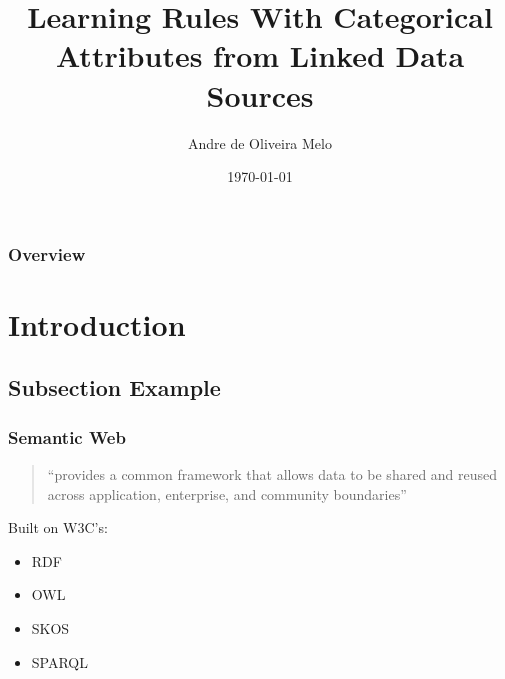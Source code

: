\documentclass{beamer}
\title[Short title]{Learning Rules With Categorical Attributes from Linked Data Sources} %
\author{Andre de Oliveira Melo} %
\institute[Saarland University] %
{
Saarland University \\ %
\medskip
\textit{andresony@gmail.com} %
}
\date{\today} %
\begin{document}
\begin{frame}
\titlepage %
\end{frame}

\begin{frame}
\frametitle{Overview} %
\tableofcontents %
\end{frame}


\section{Introduction}

\subsection{Subsection Example}

\begin{frame}
\frametitle{Semantic Web}
\begin{quote}
 ``provides a common framework that allows data to be shared and reused across application, enterprise, and community
boundaries''
\end{quote}

Built on W3C's:
\begin{itemize}
 \item RDF
 \item OWL
 \item SKOS
 \item SPARQL
\end{itemize}
\end{frame}

\end{document}
